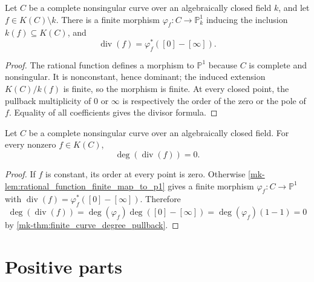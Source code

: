 \begin{lemma}
  \label{mk-lem:rational_function_finite_map_to_p1}

  Let \(C\) be a complete nonsingular curve over an algebraically closed field
  \(k\), and let
  \(f\in K(C)\setminus k\).  There is a finite morphism
  \(\varphi_f\colon C\to\mathbb P^1_k\) inducing the inclusion
  \(k(f)\subseteq K(C)\), and
  \[
    \operatorname{div}(f)
      =\varphi_f^*([0]-[\infty]).
  \]
\end{lemma}
\begin{proof}
  The rational function defines a morphism to \(\mathbb P^1\) because \(C\)
  is complete and nonsingular.  It is nonconstant, hence dominant; the
  induced extension \(K(C)/k(f)\) is finite, so the morphism is finite.
  At every closed point, the pullback multiplicity of \(0\) or \(\infty\)
  is respectively the order of the zero or the pole of \(f\).  Equality of
  all coefficients gives the divisor formula.
\end{proof}

\begin{theorem}
  \label{mk-thm:principal_deg_zero}


  Let \(C\) be a complete nonsingular curve over an algebraically closed
  field.  For every nonzero \(f\in K(C)\),
  \[
    \deg(\operatorname{div}(f))=0.
  \]
\end{theorem}
\begin{proof}
  If \(f\) is constant, its order at every point is zero.  Otherwise
  \ref{mk-lem:rational_function_finite_map_to_p1} gives a finite morphism
  \(\varphi_f\colon C\to\mathbb P^1\) with
  \(\operatorname{div}(f)=\varphi_f^*([0]-[\infty])\).  Therefore
  \[
    \deg(\operatorname{div}(f))
      =\deg(\varphi_f)\deg([0]-[\infty])
      =\deg(\varphi_f)(1-1)=0
  \]
  by \ref{mk-thm:finite_curve_degree_pullback}.
\end{proof}

\section{Positive parts}

